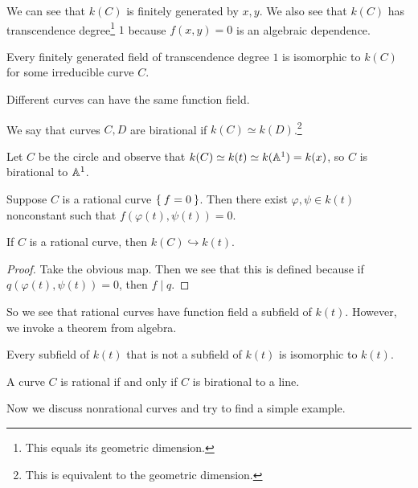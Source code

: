 \documentclass[twoside, 10pt]{article}
\begin{document}
    We can see that $k(C)$ is finitely generated by $x,y$. We also see that $k(C)$ has transcendence degree\footnote{This equals its geometric dimension.} $1$ because $f(x,y) = 0$ is an algebraic dependence. 

    \begin{lem}
        Every finitely generated field of transcendence degree $1$ is isomorphic to $k(C)$ for some irreducible curve $C$.
    \end{lem}

    \begin{rmk}
        Different curves can have the same function field.
    \end{rmk}

    \begin{defn}
        We say that curves $C,D$ are birational if $k(C) \simeq k(D)$.\footnote{This is equivalent to the geometric dimension.} 
    \end{defn}

    \begin{exm}
        Let $C$ be the circle and observe that $k(C) \simeq k(t) \simeq k(\mathbb{A}^1) = k(x)$, so $C$ is birational to $\mathbb{A}^1$.
    \end{exm}

    Suppose $C$ is a rational curve $\Set{f=0}$. Then there exist $\varphi, \psi \in k(t)$ nonconstant such that $f(\varphi(t), \psi(t)) = 0$.

    \begin{lem}
        If $C$ is a rational curve, then $k(C) \hookrightarrow k(t)$.
        \begin{proof}
            Take the obvious map. Then we see that this is defined because if $q(\varphi(t), \psi(t)) = 0$, then $f \mid q$.
        \end{proof}
    \end{lem}

    So we see that rational curves have function field a subfield of $k(t)$. However, we invoke a theorem from algebra.

    \begin{thm}[L\"uroth]
        Every subfield of $k(t)$ that is not a subfield of $k(t)$ is isomorphic to $k(t)$.
    \end{thm}

    \begin{cor}
        A curve $C$ is rational if and only if $C$ is birational to a line.
    \end{cor}

    Now we discuss nonrational curves and try to find a simple example.
\end{document}
